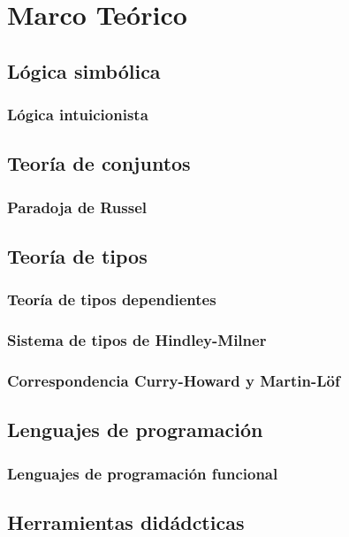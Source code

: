 \chapter{Marco Teórico}
\label{ch:marco-teorico}

\section{Lógica simbólica}
\subsection{Lógica intuicionista}

\section{Teoría de conjuntos}
\subsection{Paradoja de Russel}

\section{Teoría de tipos}
\subsection{Teoría de tipos dependientes}
\subsection{Sistema de tipos de Hindley-Milner}

\subsection{Correspondencia Curry-Howard y Martin-Löf}

\section{Lenguajes de programación}
\subsection{Lenguajes de programación funcional}

\section{Herramientas didádcticas}
